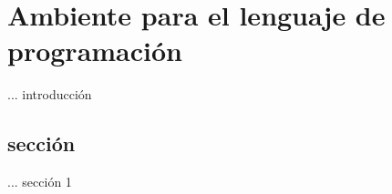 \chapter{Ambiente para el lenguaje de programaci\'on}
\label{chapter.envir}

... introducci\'on

\section{secci\'on}
\label{s1.envir}

... secci\'on 1